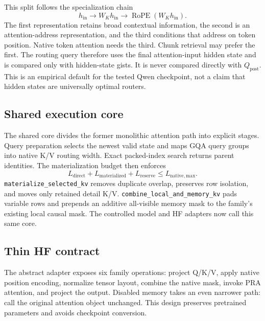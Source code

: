 \documentclass[11pt]{article}
\begin{document}
This split follows the specialization chain
\begin{equation}
 h_{\mathrm{in}} \longrightarrow W_Kh_{\mathrm{in}}
 \longrightarrow \operatorname{RoPE}(W_Kh_{\mathrm{in}}).
\end{equation}
The first representation retains broad contextual information, the second is an
attention-address representation, and the third conditions that address on token position.
Native token attention needs the third. Chunk retrieval may prefer the first. The routing query
therefore uses the final attention-input hidden state and is compared only with hidden-state
gists. It is never compared directly with $Q_{\mathrm{post}}$. This is an empirical default for
the tested Qwen checkpoint, not a claim that hidden states are universally optimal routers.

\subsection{Shared execution core}

The shared core divides the former monolithic attention path into explicit stages. Query
preparation selects the newest valid state and maps GQA query groups into native K/V routing
width. Exact packed-index search returns parent identities. The materialization budget then
enforces
\begin{equation}
 L_{\mathrm{direct}}+L_{\mathrm{materialized}}+L_{\mathrm{reserve}}
 \leq L_{\mathrm{native,max}}.
\end{equation}
\texttt{materialize\_selected\_kv} removes duplicate overlap, preserves row isolation, and
moves only retained detail K/V. \texttt{combine\_local\_and\_memory\_kv} pads variable rows
and prepends an additive all-visible memory mask to the family's existing local causal mask.
The controlled model and HF adapters now call this same core.

\subsection{Thin HF contract}

The abstract adapter exposes six family operations: project Q/K/V, apply native position
encoding, normalize tensor layout, combine the native mask, invoke PRA attention, and project
the output. Disabled memory takes an even narrower path: call the original attention object
unchanged. This design preserves pretrained parameters and avoids checkpoint conversion.
\end{document}

